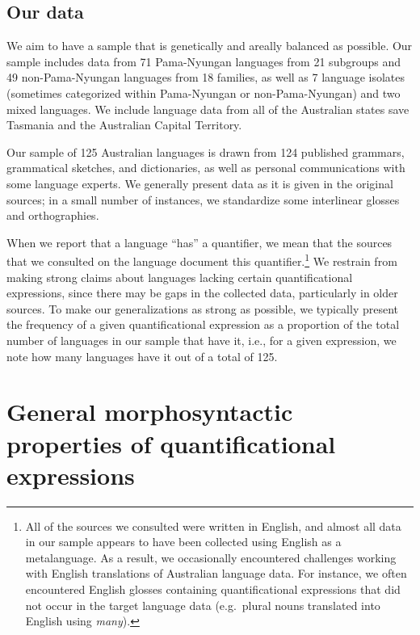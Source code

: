 \documentclass[12pt,egregdoesnotlikesansseriftitles]{scrartcl}
\begin{document}

\subsection{Our data}


We aim to have a sample that is genetically and areally balanced as possible. Our sample includes data from 71 Pama-Nyungan languages from 21 subgroups and 49 non-Pama-Nyungan languages from 18 families, as well as 7 language isolates (sometimes categorized within Pama-Nyungan or non-Pama-Nyungan) and two mixed languages. We include language data from all of the Australian states save Tasmania and the Australian Capital Territory.

Our sample of 125 Australian languages  is drawn from 124 published grammars, grammatical sketches, and dictionaries, as well as personal communications with some language experts.  We generally present data as it is given in the original sources; in a small number of  instances, we standardize some interlinear glosses and orthographies.

When we report that a language ``has'' a quantifier, we mean that the sources that we consulted on the language document this quantifier.\footnote{All of the sources we consulted were written in English, and almost all data in our sample appears to have been collected using English as a metalanguage. As a result, we occasionally encountered challenges working with English translations of Australian language data. For instance, we often encountered English glosses containing quantificational expressions that did not occur in the target language data (e.g.\ plural nouns translated into English using \textit{many}).} We restrain from making strong claims about languages lacking certain quantificational
expressions, since there may be gaps in the collected data, particularly in older sources. To make our generalizations as strong as possible, we typically present the frequency of a given quantificational expression as a proportion of the total number of languages in our sample that have it, i.e., for a given expression, we note how many languages have it out of a total of 125.

\section{General morphosyntactic properties of  quantificational expressions}
\end{document}
